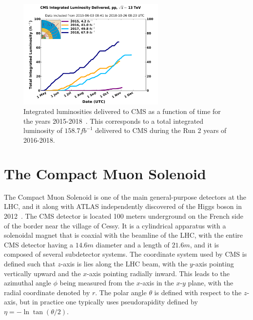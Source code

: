 \begin{figure}[htbp]
  \centering
  \includegraphics[width=0.65\textwidth]{fig/experiment/int_lumi_cumulative_pp_2_run2.pdf}
  \caption[
    Integrated luminosities delivered to CMS as a function of time for the years 2015-2018.
    This corresponds to a total integrated luminosity of $158.7\unit{fb^{-1}}$ delivered to CMS during the Run 2 years of 2016-2018.
  ]{
    Integrated luminosities delivered to CMS as a function of time for the years 2015-2018~\cite{CMSlumi}.
    This corresponds to a total integrated luminosity of $158.7\unit{fb^{-1}}$ delivered to CMS during the Run 2 years of 2016-2018.
  }
  \label{fig:CMSlumi}
\end{figure}

\section{The Compact Muon Solenoid}
\label{sec:CMS}

The Compact Muon Solenoid is one of the main general-purpose detectors at the LHC, and it along with ATLAS independently discovered of the Higgs boson in 2012~\cite{20121,201230}.
The CMS detector is located 100 meters underground on the French side of the border near the village of Cessy.
It is a cylindrical apparatus with a solenoidal magnet that is coaxial with the beamline of the LHC, with the entire CMS detector having a $14.6\unit{m}$ diameter and a length of $21.6\unit{m}$, and it is composed of several subdetector systems.
The coordinate system used by CMS is defined such that $z$-axis is lies along the LHC beam, with the $y$-axis pointing vertically upward and the $x$-axis pointing radially inward.
This leads to the azimuthal angle $\phi$ being measured from the $x$-axis in the $x$-$y$ plane, with the radial coordinate denoted by $r$.
The polar angle $\theta$ is defined with respect to the $z$-axis, but in practice one typically uses pseudorapidity defined by $\eta=-\ln\tan(\theta/2)$.

